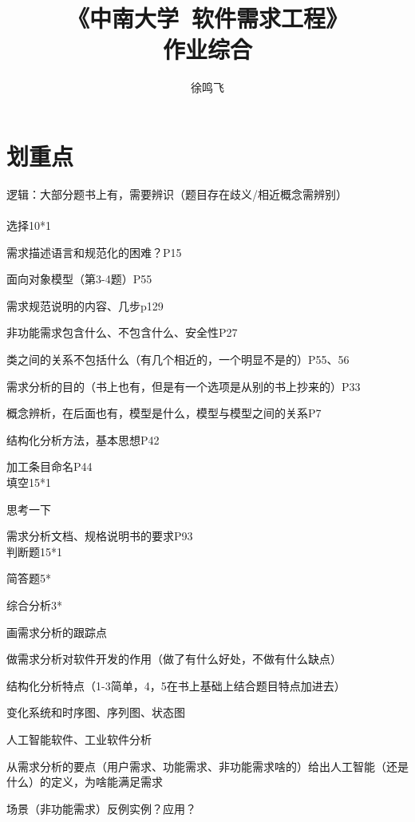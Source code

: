 \documentclass[11pt, a4paper, oneside]{ctexbook}
\title{{\Huge{\textbf{《中南大学\ 软件需求工程》}}}\\作业综合}
\author{徐鸣飞}
\date{}
\begin{document}
\maketitle
{}
\setcounter{page}{1}
\newpage
{}
\setcounter{page}{1}
\tableofcontents
\newpage
\setcounter{page}{1}
\section*{划重点}
逻辑：大部分题书上有，需要辨识（题目存在歧义/相近概念需辨别）
\\
\\
选择10*1

需求描述语言和规范化的困难？P15

面向对象模型（第3-4题）P55

需求规范说明的内容、几步p129

非功能需求包含什么、不包含什么、安全性P27

类之间的关系不包括什么（有几个相近的，一个明显不是的）P55、56

需求分析的目的（书上也有，但是有一个选项是从别的书上抄来的）P33

概念辨析，在后面也有，模型是什么，模型与模型之间的关系P7

结构化分析方法，基本思想P42

加工条目命名P44
\\

填空15*1

思考一下

需求分析文档、规格说明书的要求P93
\\

判断题15*1

简答题5*

综合分析3*

画需求分析的跟踪点

做需求分析对软件开发的作用（做了有什么好处，不做有什么缺点）

结构化分析特点（1-3简单，4，5在书上基础上结合题目特点加进去）

变化系统和时序图、序列图、状态图

人工智能软件、工业软件分析

从需求分析的要点（用户需求、功能需求、非功能需求啥的）给出人工智能（还是什么）的定义，为啥能满足需求

场景（非功能需求）反例实例？应用？
\end{document}
